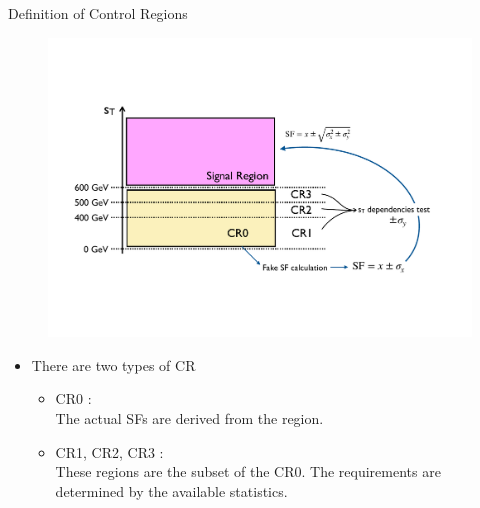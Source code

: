 \documentclass[aspectratio=46, dvipdfmx, 10pt, t]{beamer} %
\begin{document}
\begin{frame}{Definition of Control Regions}
  \begin{figure}
    \centering
        \includegraphics[scale=0.35]{overview_control_region}
  \end{figure}

  \begin{itemize}
    \item There are two types of CR
      \begin{itemize}
        \item CR0 : \\ 
          The actual SFs are derived from the region.
        \item CR1, CR2, CR3 : \\
          These regions are the subset of the CR0. The \sT requirements are determined by the available statistics.
          \hyperlink{mtw_vs_st_true}{}
          \hyperlink{mtw_vs_st_fake}{}
      \end{itemize}
  \end{itemize}
\end{frame}


\end{document}
